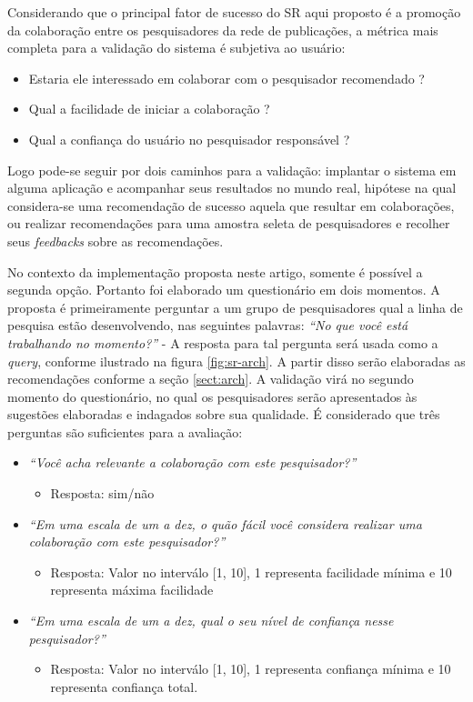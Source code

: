 \documentclass[12pt]{article}
\begin{document}
Considerando que o principal fator de sucesso do SR aqui proposto é a promoção da colaboração entre os pesquisadores da rede de 
publicações, a métrica mais completa para a validação do sistema é subjetiva ao usuário: 

\begin{itemize}
  \item Estaria ele interessado em colaborar com o pesquisador recomendado ?
  \item Qual a facilidade de iniciar a colaboração ?
  \item Qual a confiança do usuário no pesquisador responsável ?  
\end{itemize}

Logo pode-se seguir por dois caminhos para a validação: implantar o sistema em alguma aplicação e acompanhar seus resultados no 
mundo real, hipótese na qual considera-se uma recomendação de sucesso aquela que resultar em colaborações, ou realizar 
recomendações para uma amostra seleta de pesquisadores e recolher seus \textit{feedbacks} sobre as recomendações.

No contexto da implementação proposta neste artigo, somente é possível a segunda opção. Portanto foi elaborado um questionário 
em dois momentos. A proposta é primeiramente perguntar a um grupo de pesquisadores qual a linha de pesquisa estão desenvolvendo, 
nas seguintes palavras: \textit{“No que você está trabalhando no momento?”} - A resposta para tal pergunta será usada como a 
\textit{query}, conforme ilustrado na figura \ref{fig:sr-arch}. A partir disso serão elaboradas as recomendações conforme a seção 
\ref{sect:arch}. A validação virá no segundo momento do questionário, no qual os pesquisadores serão apresentados às sugestões 
elaboradas e indagados sobre sua qualidade. É considerado que três perguntas são suficientes para a avaliação:

\begin{itemize}
  \item \textit{“Você acha relevante a colaboração com este pesquisador?”}
  \begin{itemize}
    \item Resposta: sim/não
  \end{itemize}
  \item \textit{“Em uma escala de um a dez, o quão fácil você considera realizar uma colaboração com este pesquisador?”}
  \begin{itemize}
    \item Resposta: Valor no interválo [1, 10], 1 representa facilidade mínima e 10 representa máxima facilidade
  \end{itemize}
  \item \textit{“Em uma escala de um a dez, qual o seu nível de confiança nesse pesquisador?”}
  \begin{itemize}
    \item Resposta: Valor no interválo [1, 10], 1 representa confiança mínima e 10 representa confiança total.  
  \end{itemize}
\end{itemize}
\end{document}
